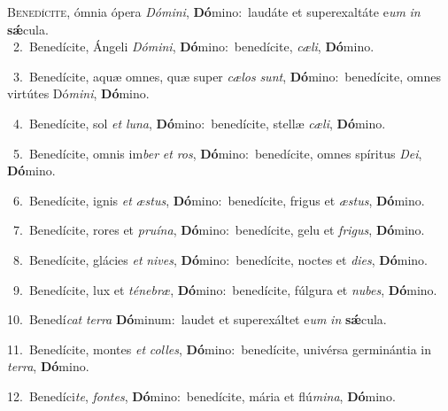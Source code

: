 \lettrine{\initial\textcolor{\initialcolor}{B}}{enedícite,} ómnia ópera \textit{Dó}\-\textit{mi}\textit{ni}, \textbf{Dó}\-mino:~\star laudáte et superexaltáte e\textit{um} \textit{in} \textbf{sǽ}\-cula.\\
{\numbfont\textcolor{\numbcolor}{~2.}}~Benedícite, Ángeli \textit{Dó}\-\textit{mi}\textit{ni}, \textbf{Dó}\-mino:~\star benedícite, \textit{cæ}\-\textit{li}, \textbf{Dó}\-mino.\par
{\numbfont\textcolor{\numbcolor}{~3.}}~Benedícite, aquæ omnes, quæ super \textit{cæ}\-\textit{los} \textit{sunt}\-, \textbf{Dó}\-mino:~\star benedícite, omnes virtútes Dó\-\textit{mi}\-\textit{ni}, \textbf{Dó}\-mino.\par
{\numbfont\textcolor{\numbcolor}{~4.}}~Benedícite, sol \textit{et} \textit{lu}\-\textit{na}, \textbf{Dó}\-mino:~\star benedícite, stellæ \textit{cæ}\-\textit{li}, \textbf{Dó}\-mino.\par
{\numbfont\textcolor{\numbcolor}{~5.}}~Benedícite, omnis im\textit{ber} \textit{et} \textit{ros}\-, \textbf{Dó}\-mino:~\star benedícite, omnes spíritus \textit{De}\-\textit{i}, \textbf{Dó}\-mino.\par
{\numbfont\textcolor{\numbcolor}{~6.}}~Benedícite, ignis \textit{et} \textit{æs}\-\textit{tus}, \textbf{Dó}\-mino:~\star benedícite, frigus et \textit{æs}\-\textit{tus}, \textbf{Dó}\-mino.\par
{\numbfont\textcolor{\numbcolor}{~7.}}~Benedícite, rores et \textit{pru}\-\textit{í}\textit{na}, \textbf{Dó}\-mino:~\star benedícite, gelu et \textit{fri}\-\textit{gus}, \textbf{Dó}\-mino.\par
{\numbfont\textcolor{\numbcolor}{~8.}}~Benedícite, glácies \textit{et} \textit{ni}\-\textit{ves}, \textbf{Dó}\-mino:~\star benedícite, noctes et \textit{di}\-\textit{es}, \textbf{Dó}\-mino.\par
{\numbfont\textcolor{\numbcolor}{~9.}}~Benedícite, lux et \textit{té}\-\textit{ne}\textit{bræ}, \textbf{Dó}\-mino:~\star benedícite, fúlgura et \textit{nu}\-\textit{bes}, \textbf{Dó}\-mino.\par
{\numbfont\textcolor{\numbcolor}{10.}}~Benedí\textit{cat} \textit{ter}\-\textit{ra} \textbf{Dó}\-minum:~\star laudet et superexáltet e\textit{um} \textit{in} \textbf{sǽ}\-cula.\par
{\numbfont\textcolor{\numbcolor}{11.}}~Benedícite, montes \textit{et} \textit{col}\-\textit{les}, \textbf{Dó}\-mino:~\star benedícite, univérsa germinántia in \textit{ter}\-\textit{ra}, \textbf{Dó}\-mino.\par
{\numbfont\textcolor{\numbcolor}{12.}}~Benedíci\-\textit{te}\-, \textit{fon}\-\textit{tes}, \textbf{Dó}\-mino:~\star benedícite, mária et flú\-\textit{mi}\-\textit{na}, \textbf{Dó}\-mino.\par
